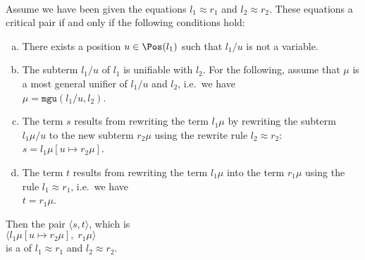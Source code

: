 \begin{Definition} \hspace*{\fill} \\
  Assume we have been given the equations $l_1 \approx r_1$ and $l_2 \approx r_2$.  These equations
   a critical pair if and only if the following conditions hold:
  \begin{enumerate}[(a)]
  \item There exists a position $u \in \Pos(l_1)$ such that $l_1/u$ is not a variable.
  \item The subterm $l_1/u$ of $l_1$ is unifiable with $l_2$.  For the following, assume that $\mu$ is a most general unifier
        of $l_1/u$ and $l_2$, i.e.~we have
        \\[0.2cm]
        \hspace*{1.3cm}
        $\mu = \texttt{mgu}(l_1/u, l_2)$.
  \item The term $s$ results from rewriting the term $l_1\mu$ by rewriting the subterm $l_1\mu/u$
        to the new subterm $r_2\mu$ using the rewrite rule $l_2 \approx r_2$:      
        \\[0.2cm]
        \hspace*{1.3cm}
        $s = l_1\mu[u \mapsto r_2\mu]$.
  \item The term $t$ results from rewriting the term $l_1\mu$ into the term $r_1\mu$ using the rule
        $l_1 \approx r_1$, i.e.~we have
        \\[0.2cm]
        \hspace*{1.3cm}
        $t = r_1\mu$.  
      \end{enumerate}
      Then the pair $\langle s, t \rangle$, which is
      \\[0.2cm]
      \hspace*{1.3cm}
      $\bigl\langle l_1\mu[u \mapsto r_2\mu],\; r_1\mu \bigr\rangle$
      \\[0.2cm]
      is a  of $l_1 \approx r_1$ and $l_2 \approx r_2$. \eod
\end{Definition}

